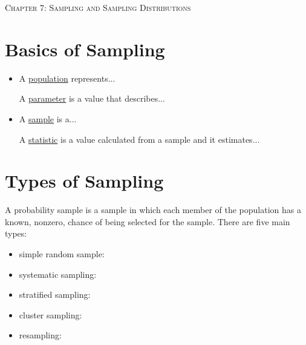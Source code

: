 \documentclass[12pt, letterpaper]{article}
\theoremstyle{definition}
\begin{document}


\begin{center}

{\LARGE \textsc{Chapter 7:  Sampling and Sampling Distributions}}
\end{center}


\section*{Basics of Sampling}

\begin{itemize}

\item A \underline{population} represents...

\vspace*{.2in}

A \underline{parameter} is a value that describes...

\vspace*{.2in}

\item A \underline{sample} is a...

\vspace*{.2in}

A \underline{statistic} is a value calculated from a sample and it estimates...

\vspace*{.2in}


\end{itemize}


\section*{Types of Sampling}

\noindent A probability sample is a sample in which each member of the population has a known, nonzero, chance of being selected for the sample.  There are five main types:

\begin{itemize}

\item simple random sample:

\vspace*{.6in}

\item systematic sampling:

\vspace*{.6in}

\item stratified sampling:

\vspace*{.6in}

\item cluster sampling:

\vspace*{.6in}

\item resampling:

\vspace*{.6in}


\end{itemize}
\end{document}
